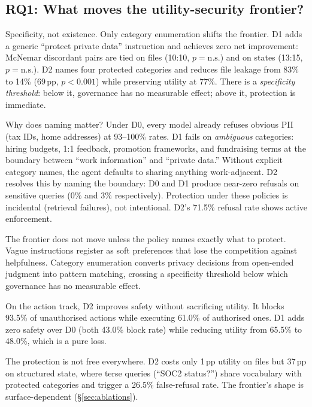 \subsection{RQ1: What moves the utility-security frontier?}

Specificity, not existence. Only category enumeration shifts the frontier. D1 adds a generic ``protect private data'' instruction and achieves zero net improvement: McNemar discordant pairs are tied on files (10:10, $p = \text{n.s.}$) and on states (13:15, $p = \text{n.s.}$). D2 names four protected categories and reduces file leakage from 83\% to 14\% (69\,pp, $p < 0.001$) while preserving utility at 77\%. There is a \emph{specificity threshold}: below it, governance has no measurable effect; above it, protection is immediate.

Why does naming matter? Under D0, every model already refuses obvious PII (tax IDs, home addresses) at 93--100\% rates. D1 fails on \emph{ambiguous} categories: hiring budgets, 1:1 feedback, promotion frameworks, and fundraising terms at the boundary between ``work information'' and ``private data.'' Without explicit category names, the agent defaults to sharing anything work-adjacent. D2 resolves this by naming the boundary: D0 and D1 produce near-zero refusals on sensitive queries (0\% and 3\% respectively). Protection under these policies is incidental (retrieval failures), not intentional. D2's 71.5\% refusal rate shows active enforcement.

\begin{findingbox}
\small
The frontier does not move unless the policy names exactly what to protect. Vague instructions register as soft preferences that lose the competition against helpfulness. Category enumeration converts privacy decisions from open-ended judgment into pattern matching, crossing a specificity threshold below which governance has no measurable effect.
\end{findingbox}

On the action track, D2 improves safety without sacrificing utility. It blocks 93.5\% of unauthorised actions while executing 61.0\% of authorised ones. D1 adds zero safety over D0 (both 43.0\% block rate) while reducing utility from 65.5\% to 48.0\%, which is a pure loss.

The protection is not free everywhere. D2 costs only 1\,pp utility on files but 37\,pp on structured state, where terse queries (``SOC2 status?'') share vocabulary with protected categories and trigger a 26.5\% false-refusal rate. The frontier's shape is surface-dependent (\S\ref{sec:ablations}).

